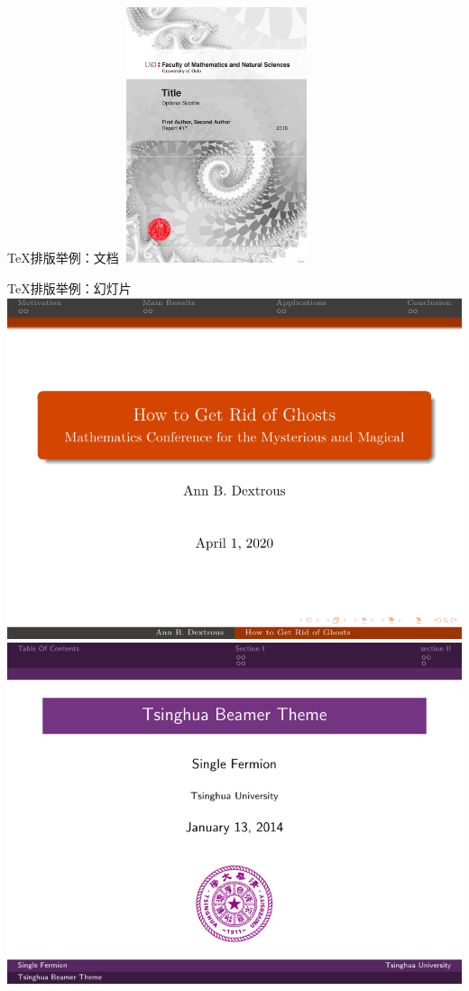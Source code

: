 \documentclass[UTF8,11pt]{beamer}
\begin{document}
\begin{frame}{\TeX 排版举例：文档}
	\centering
	\includegraphics[width=5.5cm,height=7.5cm]{figure/book}
\end{frame}


\begin{frame}{\TeX 排版举例：幻灯片}
	\includegraphics[scale=0.45]{figure/examplebeamer1}
	\includegraphics[scale=0.45]{figure/examplebeamer2}
\end{frame}
\end{document}
